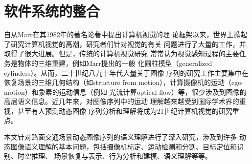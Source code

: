 \chapter{软件系统的整合}
\label{chap9}

自从Marr在其1982年的著名论著\cite{Marr:1982}中提出计算机视觉的理
论框架以来，世界上掀起了研究计算机视觉的高潮，研究者们针对视觉的有关
问题进行了大量的工作，并取得了很大进展。但是，传统的计算机视觉研究
常常认为视觉感知过程的主要任务是物体的三维重建，例如Marr提出的一般
化圆柱模型（generalized
cylinders）\cite{Marr:1982}。从而，二十世纪八九十年代大量关于图像
序列的研究工作主要集中在恢复场景的三维几何结构（如structure from
motion），计算摄像机的运动（ego-motion）和象素的运动信息（例如 光流计算optical
flow）等，很少涉及到图像的高层语义信息。近几年来，对图像序列中的运动
理解越来越受到国际学术界的重视，甚至有人预测动态图像
序列分析和理解将成为21世纪计算机视觉的研究重点。

本文针对路面交通场景动态图像序列的语义理解进行了深入研究，涉及到许多
动态图像语义理解的基本问题，包括摄像机标定、运动检测和分割、目标定位和识别、时空推理、
场景恢复与表示、行为分析和建模、语义理解等等。

